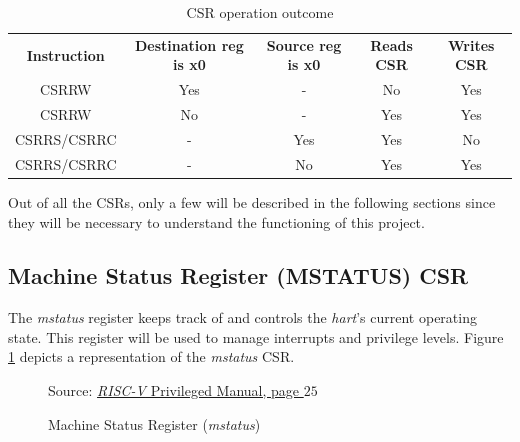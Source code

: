 \begin{table}
  \centering
  \begin{tabular}{|c|c|c|c|c|}
    \hline
    \textbf{Instruction} & \textbf{Destination reg is x0} & \textbf{Source reg is x0} & \textbf{Reads CSR} & \textbf{Writes CSR} \\
    \hhline{=====} CSRRW & Yes                            & -                         & No                 & Yes                 \\
    \hline
    CSRRW                & No                             & -                         & Yes                & Yes                 \\
    \hline
    CSRRS/CSRRC          & -                              & Yes                       & Yes                & No                  \\
    \hline
    CSRRS/CSRRC          & -                              & No                        & Yes                & Yes                 \\
    \hline
  \end{tabular}
  \caption{CSR operation outcome}
  \label{tab:csrop}
\end{table}

Out of all the CSRs, only a few will be described in the following sections
since they will be necessary to understand the functioning of this project.

\subsection{Machine Status Register (MSTATUS) CSR}
\label{subsec:mstatus}

The \textit{mstatus} register keeps track of and controls the \textit{hart}'s current
operating state. This register will be used to manage interrupts and privilege
levels. Figure \ref{fig:mstatus} depicts a representation of the \textit{mstatus}
CSR.

\begin{figure}[htbp]
  \centering
  \def\stackalignment{r} %
  {\scriptsize Source: \href{https://drive.google.com/file/d/17GeetSnT5wW3xNuAHI95-SI1gPGd5sJ_/view}{\textit{RISC-V} Privileged Manual, page $25$}}
  \caption{Machine Status Register (\textit{mstatus})}
  \label{fig:mstatus}
\end{figure}

